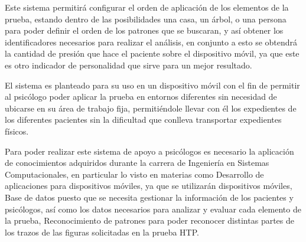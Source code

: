 Este sistema permitirá configurar el orden de aplicación de los elementos de la prueba, estando dentro de las posibilidades una casa, un árbol, o una persona para poder definir el orden de los patrones que se buscaran, y así obtener los identificadores necesarios para realizar el análisis, en conjunto a esto se obtendrá la cantidad de presión que hace el paciente sobre el dispositivo móvil, ya que este es otro indicador de personalidad que sirve para un mejor resultado.

El sistema es planteado para su uso en un dispositivo móvil con el fin de permitir al psicólogo poder aplicar la prueba en entornos diferentes sin necesidad de ubicarse en su área de trabajo fija, permitiéndole llevar con él los expedientes de los diferentes pacientes sin la dificultad que conlleva transportar expedientes físicos.

Para poder realizar este sistema de apoyo a psicólogos es necesario la aplicación de conocimientos adquiridos durante la carrera de Ingeniería en Sistemas Computacionales, en particular lo visto en materias como Desarrollo de aplicaciones para dispositivos móviles, ya que se utilizarán dispositivos móviles, Base de datos puesto que se necesita gestionar la información de los pacientes y psicólogos, así como los datos necesarios para analizar y evaluar cada elemento de la prueba, Reconocimiento de patrones para poder reconocer distintas partes de los trazos de las figuras solicitadas en la prueba HTP.